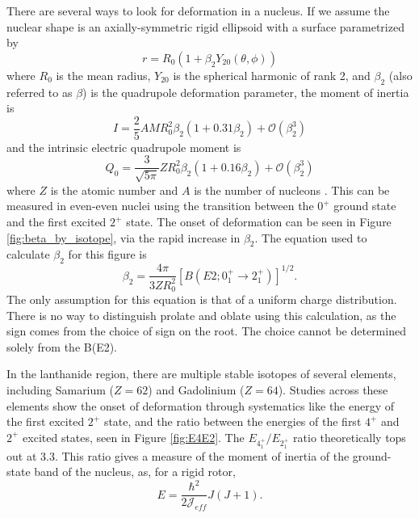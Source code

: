 

There are several ways to look for deformation in a nucleus. If we assume the nuclear shape is an axially-symmetric rigid ellipsoid with a surface parametrized by
\begin{equation}
    r = R_0(1+\beta_2 Y_{20}(\theta,\phi))
\end{equation}
where $R_0$ is the mean radius, $Y_{20}$ is the spherical harmonic of rank 2, and $\beta_2$ (also referred to as $\beta$) is the quadrupole deformation parameter, the moment of inertia is
\begin{equation}
    I = \frac{2}{5}AMR_0^2\beta_2\left(1+0.31\beta_2\right)+\mathscr{O}(\beta_2^3)
\end{equation}
and the intrinsic electric quadrupole moment is 
\begin{equation}
    Q_0 = \frac{3}{\sqrt{5\pi}}ZR_0^2\beta_2\left(1+0.16\beta_2\right)+\mathscr{O}(\beta_2^3)
\end{equation}
where $Z$ is the atomic number and $A$ is the number of nucleons \citep{casten90:_structure}. This can be measured in even-even nuclei using the transition between the $0^+$ ground state and the first excited $2^+$ state. The onset of deformation can be seen in Figure \ref{fig:beta_by_isotope}, via the rapid increase in $\beta_2$. The equation used to calculate $\beta_2$ for this figure is 
\begin{equation}
    \beta_2 = \frac{4\pi}{3ZR^2_0}\left[B(E2;0^+_1\rightarrow2^+_1)\right]^{1/2}.
\end{equation}
The only assumption for this equation is that of a uniform charge distribution\citep{raman01:_be2}. There is no way to distinguish prolate and oblate using this calculation, as the sign comes from the choice of sign on the root. The choice cannot be determined solely from the B(E2).



In the lanthanide region, there are multiple stable isotopes of several elements, including Samarium ($Z=62$) and Gadolinium ($Z=64$). Studies across these elements show the onset of deformation through systematics like the energy of the first excited $2^+$ state, and the ratio between the energies of the first $4^+$ and $2^+$ excited states, seen in Figure \ref{fig:E4E2}. The $E_{4^+_1}/E_{2^+_1}$ ratio theoretically tops out at 3.3. This ratio gives a measure of the moment of inertia of the ground-state band of the nucleus, as, for a rigid rotor,
\begin{equation}
    E=\frac{\hbar^2}{2\mathscr{J}_{eff}}J(J+1).
\end{equation}

